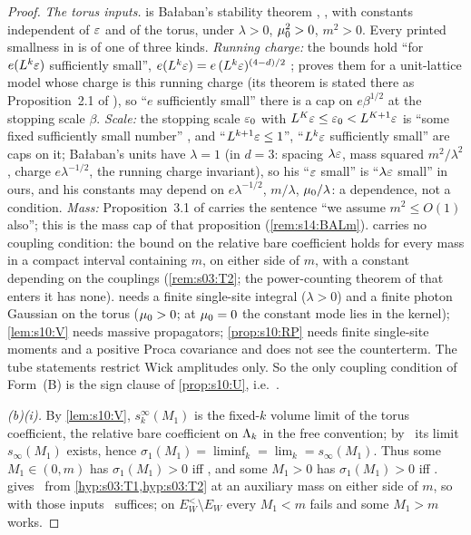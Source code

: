 \begin{proof}
\emph{The torus inputs.}  is Ba{\l}aban's stability theorem \cite[(1.14)]{Ba1}, \cite[(1.3)]{Ba2}, with constants independent of $\varepsilon$ and of the torus, under $\lambda>0$, $\mu_0^2>0$, $m^2>0$. Every printed smallness in \cite{Ba1,Ba2,Ba3,Ba4} is of one of three kinds. \emph{Running charge:} the bounds hold ``for $e(L^k\varepsilon)$ sufficiently small'', $e(L^k\varepsilon)=e\,(L^k\varepsilon)^{(4-d)/2}$ \cite[(2.23)]{Ba1}; \cite{Ba4} proves them for a unit-lattice model whose charge is this running charge (its theorem is stated there as Proposition~2.1 of \cite{Ba1}), so ``$e$ sufficiently small'' there is a cap on $e\beta^{1/2}$ at the stopping scale $\beta$. \emph{Scale:} the stopping scale $\varepsilon_0$ with $L^K\varepsilon\le\varepsilon_0<L^{K+1}\varepsilon$ is ``some fixed sufficiently small number'' \cite{Ba3}, and ``$L^{k+1}\varepsilon\le1$'', ``$L^k\varepsilon$ sufficiently small'' \cite{Ba1,Ba2} are caps on it; Ba{\l}aban's units have $\lambda=1$ (in $d=3$: spacing $\lambda\varepsilon$, mass squared $m^2/\lambda^2$, charge $e\lambda^{-1/2}$, the running charge invariant), so his ``$\varepsilon$ small'' is ``$\lambda\varepsilon$ small'' in ours, and his constants may depend on $e\lambda^{-1/2}$, $m/\lambda$, $\mu_0/\lambda$: a dependence, not a condition. \emph{Mass:} Proposition~3.1 of \cite{Ba2} carries the sentence ``we assume $m^2\le O(1)$ also''; this is the mass cap of that proposition (\cref{rem:s14:BALm}).  carries no coupling condition: the bound on the relative bare coefficient holds for every mass in a compact interval containing $m$, on either side of $m$, with a constant depending on the couplings (\cref{rem:s03:T2}; the power-counting theorem of \cite{Rei88} that enters it has none).  needs a finite single-site integral ($\lambda>0$) and a finite photon Gaussian on the torus ($\mu_0>0$; at $\mu_0=0$ the constant mode lies in the kernel); \cref{lem:s10:V} needs massive propagators; \cref{prop:s10:RP} needs finite single-site moments and a positive Proca covariance and does not see the counterterm. The tube statements restrict Wick amplitudes only. So the only coupling condition of Form~(B) is the sign clause of \cref{prop:s10:U}, i.e.\ \Tthree.

\emph{(b)(i).} By \cref{lem:s10:V}, $s^\infty_k(M_1)$ is the fixed-$k$ volume limit of the torus coefficient, the relative bare coefficient on $\Lambda_k$ in the free convention; by \sxivCT\ its limit $s_\infty(M_1)$ exists, hence $\sigma_1(M_1)=\liminf_k=\lim_k=s_\infty(M_1)$. Thus some $M_1\in(0,m)$ has $\sigma_1(M_1)>0$ iff \sxivNEl, and some $M_1>0$ has $\sigma_1(M_1)>0$ iff \sxivNE.  gives \Itwo\ from \cref{hyp:s03:T1,hyp:s03:T2} at an auxiliary mass on either side of $m$, so with those inputs \sxivNE\ suffices; on $E^<_W\setminus E_W$ every $M_1<m$ fails and some $M_1>m$ works.


\end{proof}
